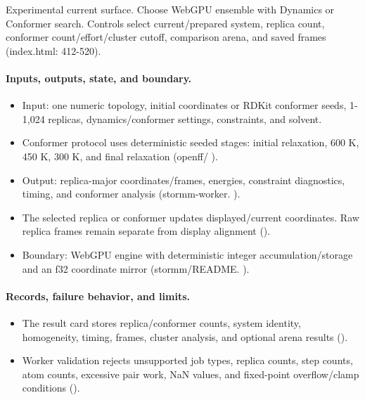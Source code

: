 \documentclass[11pt]{article}
\begin{document}
\begin{small}
Experimental current surface. Choose WebGPU ensemble with Dynamics or Conformer search. Controls select current/prepared system, replica count, conformer count/effort/cluster cutoff, comparison arena, and saved frames (index.html: 412-520).

\paragraph{Inputs, outputs, state, and boundary.}

\begin{itemize}[leftmargin=*]

\item Input: one numeric topology, initial coordinates or RDKit conformer seeds, 1-1,024 replicas, dynamics/conformer settings, constraints, and solvent.

\item Conformer protocol uses deterministic seeded stages: initial relaxation, 600 K, 450 K, 300 K, and final relaxation (openff/ ).

\item Output: replica-major coordinates/frames, energies, constraint diagnostics, timing, and conformer analysis (stormm-worker. ).

\item The selected replica or conformer updates displayed/current coordinates. Raw replica frames remain separate from display alignment ().

\item Boundary: WebGPU engine with deterministic integer accumulation/storage and an f32 coordinate mirror (stormm/README. ).

\end{itemize}

\paragraph{Records, failure behavior, and limits.}

\begin{itemize}[leftmargin=*]

\item The result card stores replica/conformer counts, system identity, homogeneity, timing, frames, cluster analysis, and optional arena results ().

\item Worker validation rejects unsupported job types, replica counts, step counts, atom counts, excessive pair work, NaN values, and fixed-point overflow/clamp conditions ().


\end{itemize}
\end{small}
\end{document}
